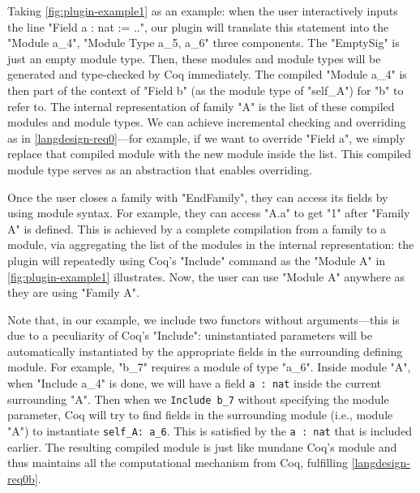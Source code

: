 Taking \cref{fig:plugin-example1} as an example: when the user
interactively inputs the line "Field a : nat := ..", our plugin will
translate this statement into the "Module a_4", "Module Type a_5, a_6"
three components.
{The "EmptySig" is just an empty module type.} Then,
these modules and module types will be generated and type-checked by Coq
immediately. The compiled "Module a_4" is then part of the context of
"Field b" (as the module type of "self_A") for "b" to refer to. The
internal representation of family "A" is the list of these
compiled modules and module types. We can achieve incremental
checking and overriding as in \ref{langdesign-req0}---for example, if we
want to override "Field a", we simply replace that compiled module with
the new module inside the list. This compiled module type serves as an
abstraction that enables overriding. 

Once the user closes a family with "EndFamily", they can access its fields by using module syntax. For example, they can access "A.a" to get "1" after "Family A" is defined. This is achieved by a complete compilation from a family to a module, via aggregating the list of the modules in the internal representation: the plugin will repeatedly using Coq's "Include" command as the "Module A" in \cref{fig:plugin-example1} illustrates. Now, the user can use "Module A" anywhere as they are using "Family A".

Note that, in our example, we include two
functors without arguments---this is due to a peculiarity of Coq's
"Include": uninstantiated parameters will be automatically
instantiated by the appropriate fields in the surrounding defining
module.
For example, "b_7" requires a module of type "a_6". Inside module "A",
when "Include a_4" is done, we will have a field \texttt{a : nat}
inside the current surrounding "A". Then when we
\texttt{Include b_7} without specifying the module parameter,
Coq will try to find fields in the surrounding module (i.e., module
"A") to instantiate \texttt{self_A: a_6}. This is satisfied by
the \texttt{a : nat} that is included earlier.
The resulting compiled module is just like mundane Coq's module and 
thus maintains all the computational mechanism from Coq, fulfilling \ref{langdesign-req0b}. 



